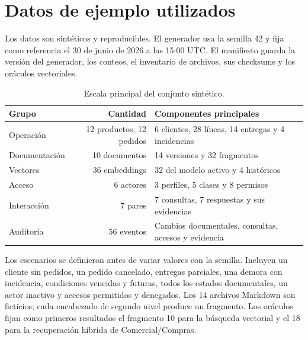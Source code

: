 \section{Datos de ejemplo utilizados}

Los datos son sintéticos y reproducibles. El generador usa la semilla 42 y fija
como referencia el 30 de junio de 2026 a las 15:00 UTC. El manifiesto guarda la
versión del generador, los conteos, el inventario de archivos, sus checksums y
los oráculos vectoriales.

\begin{table}[ht]
\centering
\small
\begin{tabular}{l r l}
\toprule
Grupo & Cantidad & Componentes principales \\
\midrule
Operación & 12 productos, 12 pedidos & 6 clientes, 28 líneas, 14 entregas y 4 incidencias \\
Documentación & 10 documentos & 14 versiones y 32 fragmentos \\
Vectores & 36 embeddings & 32 del modelo activo y 4 históricos \\
Acceso & 6 actores & 3 perfiles, 5 clases y 8 permisos \\
Interacción & 7 pares & 7 consultas, 7 respuestas y sus evidencias \\
Auditoría & 56 eventos & Cambios documentales, consultas, accesos y evidencia \\
\bottomrule
\end{tabular}
\caption{Escala principal del conjunto sintético.}
\end{table}

Los escenarios se definieron antes de variar valores con la semilla. Incluyen
un cliente sin pedidos, un pedido cancelado, entregas parciales, una demora con
incidencia, condiciones vencidas y futuras, todos los estados documentales, un
actor inactivo y accesos permitidos y denegados. Los 14 archivos Markdown son
ficticios; cada encabezado de segundo nivel produce un fragmento. Los oráculos
fijan como primeros resultados el fragmento 10 para la búsqueda vectorial y el
18 para la recuperación híbrida de Comercial/Compras.
